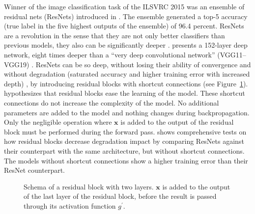 \documentclass[]{article}
\begin{document}
Winner of the image classification task of the ILSVRC 2015 was an
ensemble of residual nets (ResNets) introduced in
\citet{he_et_al_2015}.
The ensemble generated a top-5 accuracy (true label in the five
highest outputs of the ensemble) of 96.4 percent.
ResNets are a revolution in the sense that they are not only better
classifiers than previous models, they also can be significantly
deeper \citep{he_et_al_2015}.
\citet{he_et_al_2015} presents a 152-layer deep network, eight times
deeper than a ``very deep convolutional network'' (VGG11--VGG19)
\citep{simonyan_et_al_2014, he_et_al_2015}.
ResNets can be so deep, without losing their ability of convergence
and without degradation (saturated accuracy and higher training error
with increased depth) \citep{he_et_al_2015}, by introducing residual
blocks with shortcut connections (see Figure~\ref{fig:shortcut_conn}).
\citet{he_et_al_2015} hypothesizes that residual blocks ease the
learning of the model.
These shortcut connections do not increase the complexity of the
model. No additional parameters are added to the model and nothing
changes during backpropagation.
Only the negligible operation where $\mathbf{x}$ is added to the
output of the residual block must be performed during the forward
pass.
\citet{he_et_al_2015} shows comprehensive tests on how residual blocks
decrease degradation impact by comparing ResNets against their
counterpart with the same architecture, but without shortcut
connections.
The models without shortcut connections show a higher training error
than their ResNet counterpart.

\begin{figure}
  \begin{center}
  \end{center}
  \caption{Schema of a residual block with two layers. $\mathbf{x}$ is
    added to the output of the last layer of the residual block,
    before the result is passed through its activation function
    $g^\prime$.}
  \label{fig:shortcut_conn}
\end{figure}
\end{document}

